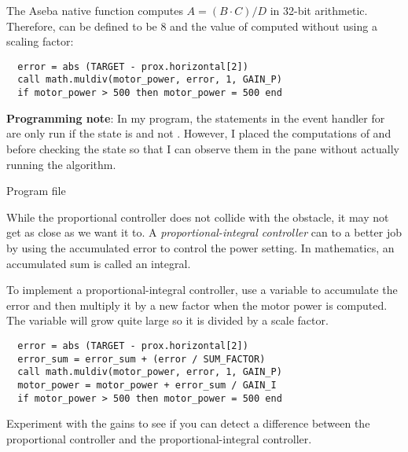 The Aseba native function  computes $A = (B
\cdot C) / D$ in 32-bit arithmetic. Therefore,  can be
defined to be 8 and the value of  computed without using
a scaling factor:

\newpage

\begin{verbatim}
  error = abs (TARGET - prox.horizontal[2])
  call math.muldiv(motor_power, error, 1, GAIN_P)
  if motor_power > 500 then motor_power = 500 end
\end{verbatim}

\textbf{Programming note}: In my program, the statements in the event
handler for  are only run if the state is  and not .
However, I placed the computations of  and 
before checking the state so that I can observe them in the
 pane without actually running the algorithm.


{\raggedleft \hfill Program file }

While the proportional controller does not collide with the obstacle, it
may not get as close as we want it to. A \emph{proportional-integral
controller} can to a better job by using the accumulated error to
control the power setting. In mathematics, an accumulated sum is called
an integral.

To implement a proportional-integral controller, use a variable 
to accumulate
the error and then multiply it by a new factor  when the
motor power is computed. The variable  will grow quite
large so it is divided by a scale factor.

\begin{verbatim}
  error = abs (TARGET - prox.horizontal[2])
  error_sum = error_sum + (error / SUM_FACTOR)
  call math.muldiv(motor_power, error, 1, GAIN_P)
  motor_power = motor_power + error_sum / GAIN_I
  if motor_power > 500 then motor_power = 500 end
\end{verbatim}

Experiment with the gains to see if you can detect a difference between
the proportional controller and the proportional-integral controller.
